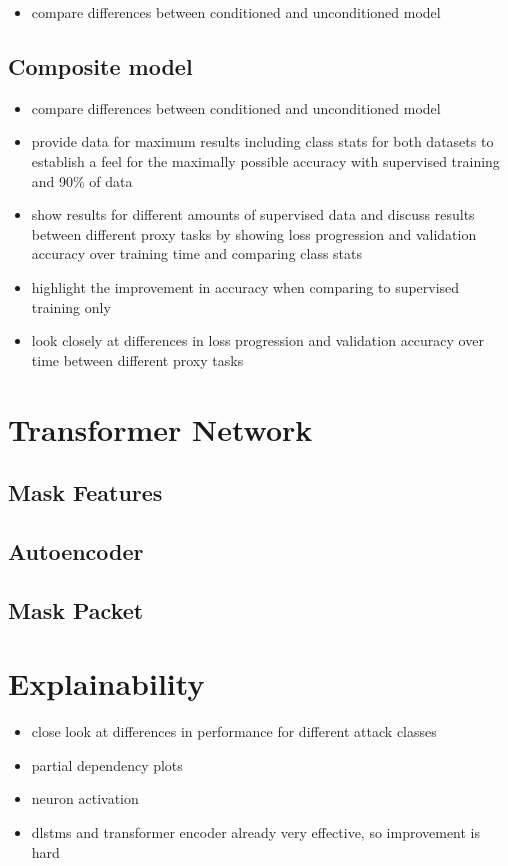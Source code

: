 \begin{itemize}
	\item compare differences between conditioned and unconditioned model
\end{itemize} 

\subsection{Composite model} \label{sec:results:lstm:composite}

\begin{itemize}
	\item compare differences between conditioned and unconditioned model
\end{itemize} 

\begin{itemize}
	\item provide data for maximum results including class stats for both datasets to establish a feel for the maximally possible accuracy with supervised training and 90\% of data
	\item show results for different amounts of supervised data and discuss results between different proxy tasks by showing loss progression and validation accuracy over training time and comparing class stats
	\item highlight the improvement in accuracy when comparing to supervised training only
	\item look closely at differences in loss progression and validation accuracy over time between different proxy tasks
\end{itemize}

\section{Transformer Network} \label{sec:results:transformer}

\subsection{Mask Features} \label{sec:results:transformer:mask_features}

\subsection{Autoencoder} \label{sec:results:transformer:autoencoder}

\subsection{Mask Packet} \label{sec:results:transformer:mask_packet}

\section{Explainability}

\begin{itemize}
	\item close look at differences in performance for different attack classes
	\item partial dependency plots
	\item neuron activation
	\item \gls{dlstm}s and transformer encoder already very effective, so improvement is hard
\end{itemize}

\newpage
